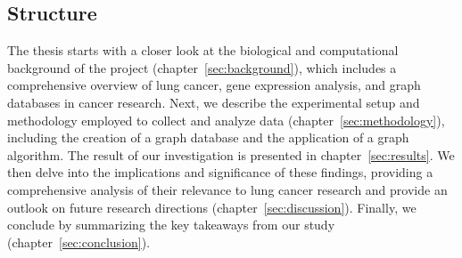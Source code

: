 \subsection{Structure}  \label{subsec:structure}

The thesis starts with a closer look at the biological and computational background of the project (chapter~\ref{sec:background}),
which includes a comprehensive overview of lung cancer, gene expression analysis, and graph databases in cancer research.
Next, we describe the experimental setup and methodology employed to collect and analyze data (chapter~\ref{sec:methodology}),
including the creation of a graph database and the application of a graph algorithm.
The result of our investigation is presented in chapter~\ref{sec:results}.
We then delve into the implications and significance of these findings,
providing a comprehensive analysis of their relevance to lung cancer research and provide an outlook
on future research directions (chapter~\ref{sec:discussion}).
Finally, we conclude by summarizing the key takeaways from our study (chapter~\ref{sec:conclusion}).
